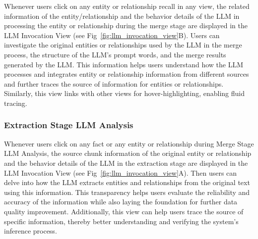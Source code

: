 Whenever users click on any entity or relationship recall in any view, the related information of the entity/relationship and the behavior details of the LLM in processing the entity or relationship during the merge stage are displayed in the LLM
Invocation View (see Fig~\ref{fig:llm_invocation_view}B). Users can investigate the original entities or relationships used by the LLM in the merge process, the structure of the LLM's prompt words, and the merge results generated by the LLM. This information helps users understand how the LLM processes and integrates entity or relationship information from different sources and further traces the source of information for entities or relationships. Similarly, this view links with other views for hover-highlighting, enabling fluid tracing.

\subsubsection{Extraction Stage LLM Analysis}

Whenever users click on any fact or any entity or relationship during Merge Stage LLM Analysis, the source chunk information of the original entity or relationship and the behavior details of the LLM in the extraction stage are displayed in the LLM
Invocation View (see Fig~\ref{fig:llm_invocation_view}A). Then users can delve into how the LLM extracts entities and relationships from the original text using this information. This transparency helps users evaluate the reliability and accuracy of the information while also laying the foundation for further data quality improvement. Additionally, this view can help users trace the source of specific information, thereby better understanding and verifying the system's inference process.
